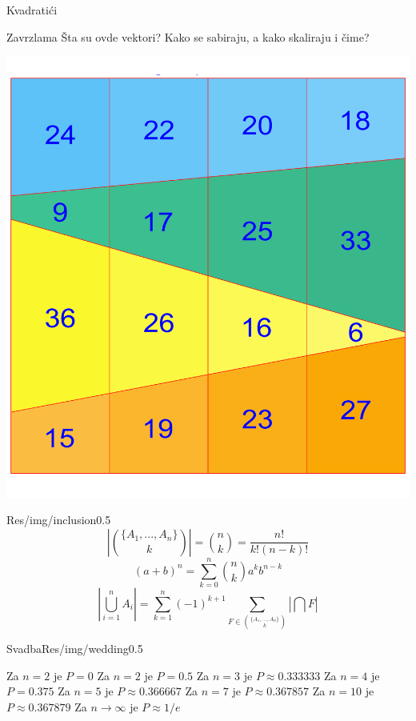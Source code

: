 \documentclass{beamer}
\newenvironment{thinker}{\begin{alertblock}{Zavrzlama}}{\end{alertblock}}
\begin{document}
    \begin{frame}{Kvadratići}
        \begin{thinker}
            Šta su ovde vektori? Kako se sabiraju, a kako skaliraju i čime?
        \end{thinker}
        \includegraphics[height=\textheight]{Res/img/magic_square}
    \end{frame}
    
    \begin{framebg}{}{Res/img/inclusion}{0.5}
        $$ \left| \binom{\{A_1,...,A_n\}} k \right| = \binom n k = \frac {n!} {k! (n-k)!}
        $$
        $$(a + b)^n = \sum_{k=0}^n \binom n k a^k b^{n-k}
        $$
        $$\left| \bigcup_{i=1}^n A_i\right| = 
         \sum_{k=1}^n (-1)^{k+1}\sum_{F \in \binom{\{A_1,...,A_n\}} k} \left| \bigcap F \right|
        $$

    \end{framebg}
    \begin{framebg}{Svadba}{Res/img/wedding}{0.5}
        \pause
        \begin{itemize}
            \itemR Za $n=2$  je $P = 0$ \pause
            \itemR Za $n=2$  je $P = 0.5$ \pause
            \itemR Za $n=3$  je $P \approx 0.333333$ \pause
            \itemR Za $n=4$  je $P = 0.375$ \pause
            \itemR Za $n=5$  je $P \approx 0.366667$ \pause
            \itemR Za $n=7$  je $P \approx 0.367857$ \pause
            \itemR Za $n=10$ je $P \approx 0.367879$ \pause
            \itemR Za $n \to \infty$ je $P \approx 1/e$
        \end{itemize}
    \end{framebg}
\end{document}
